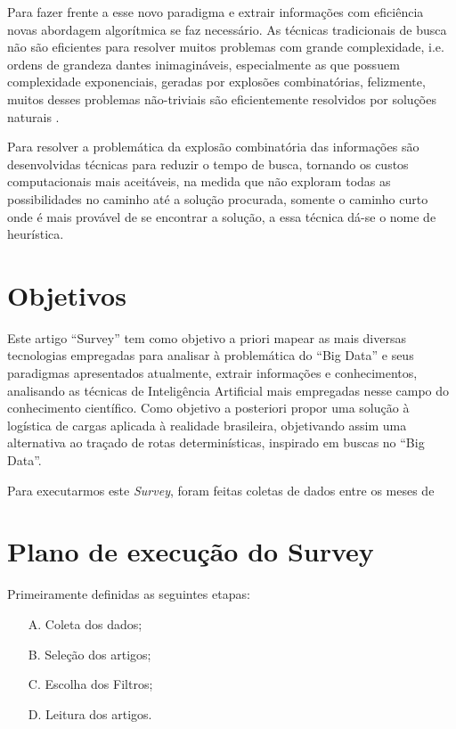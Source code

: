 \documentclass[conference,compsoc]{IEEEtran}
\begin{document}
Para fazer frente a esse novo paradigma e extrair informações com eficiência novas abordagem algorítmica se faz necessário. 
As técnicas tradicionais de busca não são eficientes para resolver muitos problemas com grande complexidade, i.e. ordens de grandeza 
dantes inimagináveis, especialmente as que possuem complexidade exponenciais, geradas por explosões combinatórias, felizmente, 
muitos desses problemas não-triviais são eficientemente resolvidos por soluções naturais \cite{Swarm_Medeiros}.

Para resolver a problemática da explosão combinatória das informações são desenvolvidas técnicas para reduzir o tempo de busca, 
tornando os custos computacionais mais aceitáveis, na medida que não exploram todas as possibilidades no caminho até a 
solução procurada, somente o caminho curto onde é mais provável de se encontrar a solução, a essa técnica dá-se o nome de heurística.



\section{Objetivos}

Este artigo ``Survey'' tem como objetivo a priori mapear as mais diversas tecnologias empregadas para analisar à problemática do ``Big Data'' e seus paradigmas apresentados atualmente, extrair informações e conhecimentos, analisando as técnicas de Inteligência Artificial mais empregadas nesse campo do conhecimento científico.
Como objetivo a posteriori propor uma solução à logística de cargas aplicada à realidade brasileira, objetivando assim uma alternativa ao traçado de rotas determinísticas, inspirado em buscas no ``Big Data''.

Para executarmos este \textit{Survey}, foram feitas coletas de dados entre os meses de 

\section{Plano de execução do Survey}

Primeiramente definidas as seguintes etapas:

\begin{enumerate}
 \item[A.] Coleta dos dados;
 \item[B.] Seleção dos artigos; 
 \item[C.] Escolha dos Filtros;
 \item[D.] Leitura dos artigos.
\end{enumerate}
\end{document}
